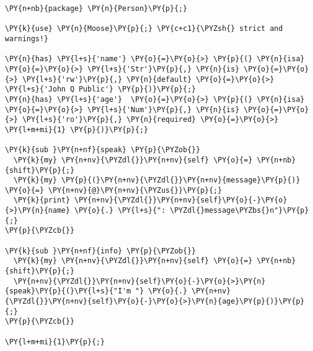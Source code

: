 \begin{Verbatim}[commandchars=\\\{\}]
\PY{n+nb}{package} \PY{n}{Person}\PY{p}{;}

\PY{k}{use} \PY{n}{Moose}\PY{p}{;} \PY{c+c1}{\PYZsh{} strict and warnings!}

\PY{n}{has} \PY{l+s}{'name'} \PY{o}{=}\PY{o}{>} \PY{p}{(} \PY{n}{isa} \PY{o}{=}\PY{o}{>} \PY{l+s}{'Str'}\PY{p}{,} \PY{n}{is} \PY{o}{=}\PY{o}{>} \PY{l+s}{'rw'}\PY{p}{,} \PY{n}{default} \PY{o}{=}\PY{o}{>} \PY{l+s}{'John Q Public'} \PY{p}{)}\PY{p}{;}
\PY{n}{has} \PY{l+s}{'age'}  \PY{o}{=}\PY{o}{>} \PY{p}{(} \PY{n}{isa} \PY{o}{=}\PY{o}{>} \PY{l+s}{'Num'}\PY{p}{,} \PY{n}{is} \PY{o}{=}\PY{o}{>} \PY{l+s}{'ro'}\PY{p}{,} \PY{n}{required} \PY{o}{=}\PY{o}{>} \PY{l+m+mi}{1} \PY{p}{)}\PY{p}{;}

\PY{k}{sub }\PY{n+nf}{speak} \PY{p}{\PYZob{}}
  \PY{k}{my} \PY{n+nv}{\PYZdl{}}\PY{n+nv}{self} \PY{o}{=} \PY{n+nb}{shift}\PY{p}{;}
  \PY{k}{my} \PY{p}{(}\PY{n+nv}{\PYZdl{}}\PY{n+nv}{message}\PY{p}{)} \PY{o}{=} \PY{n+nv}{@}\PY{n+nv}{\PYZus{}}\PY{p}{;}
  \PY{k}{print} \PY{n+nv}{\PYZdl{}}\PY{n+nv}{self}\PY{o}{-}\PY{o}{>}\PY{n}{name} \PY{o}{.} \PY{l+s}{": \PYZdl{}message\PYZbs{}n"}\PY{p}{;}
\PY{p}{\PYZcb{}}

\PY{k}{sub }\PY{n+nf}{info} \PY{p}{\PYZob{}}
  \PY{k}{my} \PY{n+nv}{\PYZdl{}}\PY{n+nv}{self} \PY{o}{=} \PY{n+nb}{shift}\PY{p}{;}
  \PY{n+nv}{\PYZdl{}}\PY{n+nv}{self}\PY{o}{-}\PY{o}{>}\PY{n}{speak}\PY{p}{(}\PY{l+s}{"I'm "} \PY{o}{.} \PY{n+nv}{\PYZdl{}}\PY{n+nv}{self}\PY{o}{-}\PY{o}{>}\PY{n}{age}\PY{p}{)}\PY{p}{;} 
\PY{p}{\PYZcb{}}

\PY{l+m+mi}{1}\PY{p}{;}
\end{Verbatim}
